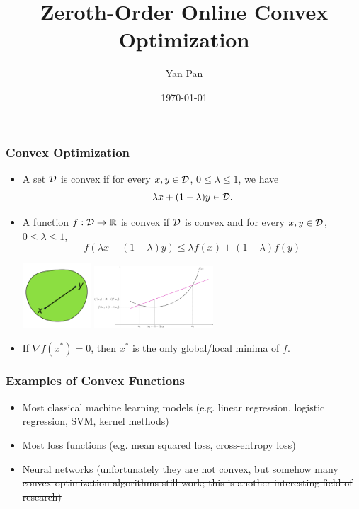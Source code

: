 \documentclass{beamer}
\title{Zeroth-Order Online Convex Optimization}
\author{Yan Pan}
\institute{Carnegie Mellon University}
\date{\today}
\begin{document}
\frame{\titlepage}

\begin{frame}
    \frametitle{Convex Optimization}
    \begin{itemize}
        \item A set $\mathcal{D}$ is convex if for every $x, y \in \mathcal{D}$, $0 \le \lambda \le 1$, we have
        \[
            \lambda x + (1 - \lambda) y \in \mathcal{D}.
        \]
        \item A function $f : \mathcal{D} \to \mathbb{R}$ is convex if $\mathcal{D}$ is convex and for every $x, y \in \mathcal{D}$, $0 \le \lambda \le 1$,
        \[
            f(\lambda x + (1 - \lambda) y) \le \lambda f(x) + (1 - \lambda) f(y)
        \]
        \begin{center}
            \includegraphics[width=0.2\textwidth]{convex_set.png}
            \includegraphics[width=0.35\textwidth]{convex_function.png}
        \end{center}
        \item If $\nabla f(x^*) = 0$, then $x^*$ is the only global/local minima of $f$.
    \end{itemize}
\end{frame}

\begin{frame}
    \frametitle{Examples of Convex Functions}
    \begin{itemize}
        \item Most classical machine learning models (e.g. linear regression, logistic regression, SVM, kernel methods)
        \item Most loss functions (e.g. mean squared loss, cross-entropy loss)
        \item \sout{Neural networks (unfortunately they are not convex, but somehow many convex optimization algorithms still work; this is another interesting field of research)}
    \end{itemize}
\end{frame}
\end{document}
